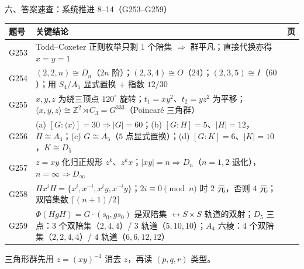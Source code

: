 \documentclass[aspectratio=169,10pt,fontset=none]{ctexbeamer}
\begin{document}
\begin{frame}[t]{六、答案速查：系统推进 8--14（G253--G259）}
  \centering
  \scriptsize
  \setlength{\tabcolsep}{3pt}
  \renewcommand{\arraystretch}{1.12}
  \begin{tabular}{@{}l p{9.9cm} c@{}}
    \toprule
    题号 & 关键结论 & 页\\
    \midrule
    G253 & Todd--Coxeter 正则枚举只剩 $1$ 个陪集 $\Rightarrow$ 群平凡；直接代换亦得 $x=y=1$ & \pageref{ex:G253}\\
    G254 & $(2,2,n)\cong D_n$（$2n$ 阶）；$(2,3,4)\cong O$（$24$）；$(2,3,5)\cong I$（$60$）；用 $S_4/A_5$ 显式置换 + 指数 $12/30$ & \pageref{ex:G254}\\
    G255 & $x,y,z$ 为绕三顶点 $120^\circ$ 旋转；$t_1=xy^2$、$t_2=yz^2$ 为平移；$\langle x,y,z\rangle\cong\mathbb Z^2\rtimes C_3=G^{333}$（Poincaré 三角群） & \pageref{ex:G255}\\
    G256 & (a) $[G:\langle x\rangle]=30\Rightarrow|G|=60$；(b) $[G:H]=5$、$|H|=12$，$H\cong A_4$；(c) $G\cong A_5$（$5$ 点显式置换）；(d) $[G:K]=6$、$|K|=10$，$K\cong D_5$ & \pageref{ex:G256}\\
    G257 & $z=xy$ 化归正规形 $z^k$、$z^kx$；$|xy|=n\Rightarrow D_n$（$n=1,2$ 退化），$n=\infty\Rightarrow D_\infty$ & \pageref{ex:G257}\\
    G258 & $Hx^iH=\{x^i,x^{-i},x^iy,x^{-i}y\}$；$2i\equiv0\pmod n$ 时 $2$ 元，否则 $4$ 元；双陪集数 $\lceil(n+1)/2\rceil$ & \pageref{ex:G258}\\
    G259 & $\Phi(HgH)=G\cdot(s_0,gs_0)$ 是双陪集 $\leftrightarrow S\times S$ 轨道的双射；$D_5$ 三点：$3$ 个双陪集（$2,4,4$）/ $3$ 轨道（$5,10,10$）；$A_4$ 六棱：$4$ 个双陪集（$2,2,4,4$）/ $4$ 轨道（$6,6,12,12$） & \pageref{ex:G259}\\
    \bottomrule
  \end{tabular}
  \par
  \vspace{0.3em}
  {\scriptsize\color{ink!70} 三角形群先用 $z=(xy)^{-1}$ 消去 $z$，再读 $(p,q,r)$ 类型。}
\end{frame}
\end{document}
